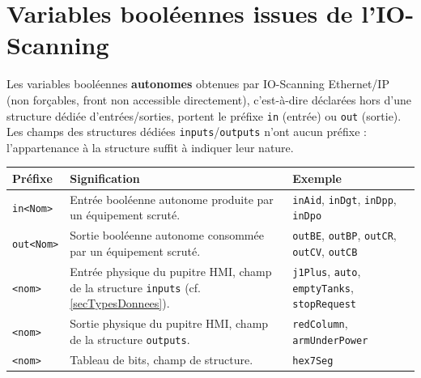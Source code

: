 \section{Variables booléennes issues de l'IO-Scanning}
\label{secVariablesBooleennes}

Les variables booléennes \textbf{autonomes} obtenues par IO-Scanning Ethernet/IP (non forçables,
front non accessible directement), c'est-à-dire déclarées hors d'une structure dédiée
d'entrées/sorties, portent le préfixe \texttt{in} (entrée) ou \texttt{out} (sortie). Les champs
des structures dédiées \texttt{inputs}/\texttt{outputs} n'ont aucun préfixe : l'appartenance à la
structure suffit à indiquer leur nature.

\begin{center}
    \begin{tabular}{|p{2.8cm}|p{6.5cm}|p{5cm}|}
        \hline
        \textbf{Préfixe} & \textbf{Signification} & \textbf{Exemple} \\
        \hline
        \texttt{in<Nom>} & Entrée booléenne autonome produite par un équipement scruté. & \texttt{inAid}, \texttt{inDgt}, \texttt{inDpp}, \texttt{inDpo} \\
        \hline
        \texttt{out<Nom>} & Sortie booléenne autonome consommée par un équipement scruté. & \texttt{outBE}, \texttt{outBP}, \texttt{outCR}, \texttt{outCV}, \texttt{outCB} \\
        \hline
        \texttt{<nom>} & Entrée physique du pupitre HMI, champ de la structure \texttt{inputs} (cf. \ref{secTypesDonnees}). & \texttt{j1Plus}, \texttt{auto}, \texttt{emptyTanks}, \texttt{stopRequest} \\
        \hline
        \texttt{<nom>} & Sortie physique du pupitre HMI, champ de la structure \texttt{outputs}. & \texttt{redColumn}, \texttt{armUnderPower} \\
        \hline
        \texttt{<nom>} & Tableau de bits, champ de structure. & \texttt{hex7Seg} \\
        \hline
    \end{tabular}
\end{center}

